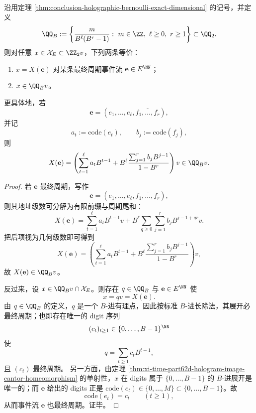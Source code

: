 \begin{theorem}\label{thm:conclusion-holographic-eventual-periodic-badic-rationals}
沿用定理 \ref{thm:conclusion-holographic-bernoulli-exact-dimensional} 的记号，并定义
\[
\QQ_B:=
\left\{
\frac{m}{B^\ell(B^r-1)}:\ m\in\ZZ,\ \ell\ge 0,\ r\ge 1
\right\}
\subset \QQ_2.
\]
则对任意 \(x\in \mathcal X_E\subset \ZZ_2v\)，下列两条等价：
\begin{enumerate}
  \item \(x=X(\mathbf e)\) 对某条最终周期事件流 \(\mathbf e\in E^{\NN}\)；
  \item \(x\in \QQ_B v\)。
\end{enumerate}
更具体地，若
\[
\mathbf e=(e_1,\dots,e_\ell,\overline{f_1,\dots,f_r}),
\]
并记
\[
a_t:=\mathrm{code}(e_t),
\qquad
b_j:=\mathrm{code}(f_j),
\]
则
\[
X(\mathbf e)
=
\left(
\sum_{t=1}^{\ell} a_t B^{t-1}
+
B^\ell\frac{\sum_{j=1}^{r} b_j B^{j-1}}{1-B^r}
\right)v
\in
\QQ_B v.
\]
\end{theorem}
\begin{proof}
若 \(\mathbf e\) 最终周期，写作
\[
\mathbf e=(e_1,\dots,e_\ell,\overline{f_1,\dots,f_r}),
\]
则其地址级数可分解为有限前缀与周期尾和：
\[
X(\mathbf e)
=
\sum_{t=1}^{\ell}a_t B^{t-1}v
+
B^\ell\sum_{q\ge 0}\sum_{j=1}^{r}b_j B^{j-1+qr}v.
\]
把后项视为几何级数即可得到
\[
X(\mathbf e)
=
\left(
\sum_{t=1}^{\ell} a_t B^{t-1}
+
B^\ell\frac{\sum_{j=1}^{r} b_j B^{j-1}}{1-B^r}
\right)v,
\]
故 \(X(\mathbf e)\in \QQ_B v\)。

反过来，设 \(x\in \QQ_B v\cap \mathcal X_E\)。则存在 \(q\in \QQ_B\) 与 \(\mathbf e\in E^{\NN}\) 使
\[
x=qv=X(\mathbf e).
\]
由 \(q\in \QQ_B\) 的定义，\(q\) 是一个 \(B\)-进有理点，因此按标准 \(B\)-进长除法，其展开必最终周期；也即存在唯一的 digit 序列
\[
(c_t)_{t\ge 1}\in \{0,\dots,B-1\}^{\NN}
\]
使
\[
q=\sum_{t\ge 1}c_t B^{t-1},
\]
且 \((c_t)\) 最终周期。
另一方面，由定理 \ref{thm:xi-time-part62d-hologram-image-cantor-homeomorphism} 的单射性，\(x\) 在 digits 属于 \(\{0,\dots,B-1\}\) 的 \(B\)-进展开是唯一的；而 \(\mathbf e\) 给出的 digits 正是 \(\mathrm{code}(e_t)\in\{0,\dots,M\}\subset\{0,\dots,B-1\}\)。故
\[
\mathrm{code}(e_t)=c_t
\qquad (t\ge 1),
\]
从而事件流 \(\mathbf e\) 也最终周期。证毕。
\end{proof}


